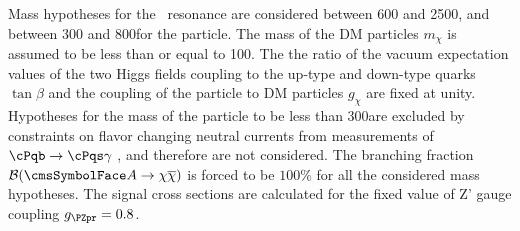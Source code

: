 Mass hypotheses for the \cPZpr\ resonance are considered between 600 and 2500\GeV, and between 300 and 800\GeV for the \Az particle. The mass of the DM particles $m_{\chi}$
is assumed to be less than or equal to 100\GeV. The the
ratio of the vacuum expectation values of the two Higgs fields coupling to the up-type and down-type
quarks $\tan \beta$ and the coupling of the \Az particle to DM particles $g_{\chi}$ are fixed at unity. 
Hypotheses for the mass of the \Az particle to be less than 300\GeV are excluded by constraints on flavor changing
neutral currents from measurements of $\cPqb\rightarrow \cPqs\gamma$ \cite{Branco:2011iw},
and therefore are not considered. 
The branching fraction ${\cal B}(\Az\rightarrow\chi\overline{\chi})$ is forced to be $100\%$ for all the considered mass hypotheses.
The signal cross sections are calculated for the fixed value of Z' gauge coupling $\gzp = 0.8$.

